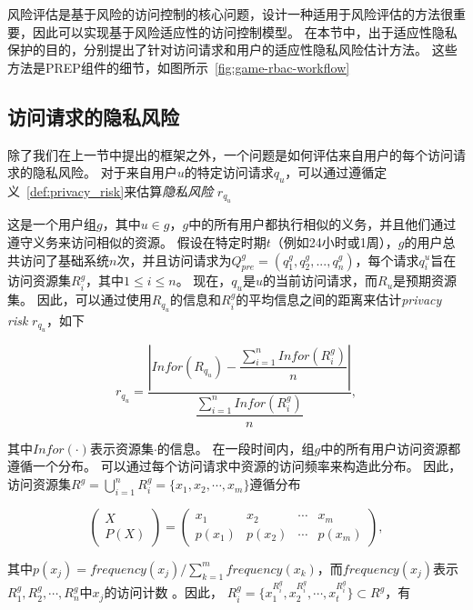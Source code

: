 风险评估是基于风险的访问控制的核心问题，设计一种适用于风险评估的方法很重要，因此可以实现基于风险适应性的访问控制模型。 在本节中，出于适应性隐私保护的目的，分别提出了针对访问请求和用户的适应性隐私风险估计方法。 这些方法是PREP组件的细节，如图所示~\ref{fig:game-rbac-workflow}

\subsection{访问请求的隐私风险}

除了我们在上一节中提出的框架之外，一个问题是如何评估来自用户的每个访问请求的隐私风险。 对于来自用户$u$的特定访问请求$q_u$，可以通过遵循定义~\ref{def:privacy_risk}来估算\emph{隐私风险} $r_{q_u}$



这是一个用户组$g$，其中$u \in g$，$g$中的所有用户都执行相似的义务，并且他们通过遵守义务来访问相似的资源。 假设在特定时期$t$（例如24小时或1周），$g$的用户总共访问了基础系统$n$次，并且访问请求为$Q^g_{pre}=(q^g_1,q^g_2,...,q^g_n)$，每个请求$q^u_i$旨在访问资源集$R^g_i$，其中$1 \leq i \leq n$。
现在，$q_u$是$u$的当前访问请求，而$R_u$是预期资源集。 因此，可以通过使用$R_{q_u}$的信息和$R^g_i$的平均信息之间的距离来估计\emph{privacy risk} $r_{q_u}$，如下

\begin{equation}\label{eq:privacy_risk_qu}
r_{q_u} = \dfrac{|Infor(R_{q_u})-\dfrac{\sum ^{n}_{i=1} Infor(R^g_i)}{n}|}{\dfrac{\sum ^{n}_{i=1} Infor(R^g_i)}{n}}, 
\end{equation}

其中$Infor(\cdot)$表示资源集$\cdot$的信息。 在一段时间内，组$g$中的所有用户访问资源都遵循一个分布。 可以通过每个访问请求中资源的访问频率来构造此分布。 因此，访问资源集$R^g = \bigcup _{i=1}^n R^g_i=\{x_1, x_2, \cdots, x_m\}$遵循分布

\begin{equation}\label{eq:distribution_Rg}
\left(
\begin{array}{c}
X \\ P(X)
\end{array}
\right)
=\left(
\begin{array}{cccccccccc}
x_1 &  x_2 & \cdots & x_m
\\ p(x_1) &  p(x_2) & \cdots & p(x_m)
\end{array}
\right),
\end{equation}

其中$p(x_j)=frequency(x_j)/\sum_{k=1}^m frequency(x_k)$，而$frequency(x_j)$表示$R^g_1, R^g_2, \cdots, R^g_n$中$x_j$的访问计数 。因此， $R^g_i =\{x_1^{R^g_i},x_2^{R^g_i},\cdots, x_t^{R^g_i}\} \subset R^g$，有

